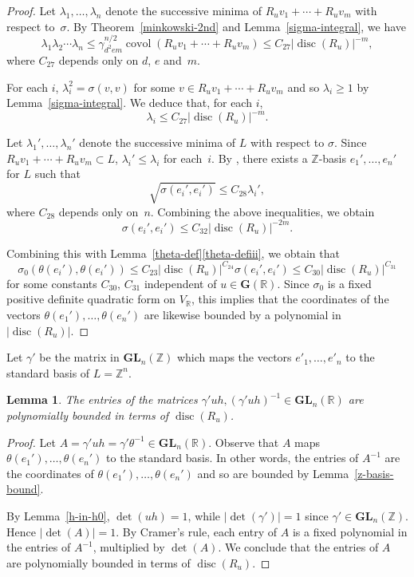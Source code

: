\documentclass[11pt]{article}
\numberwithin{equation}{section}
\newcommand{\bR}{\mathbb{R}}
\newcommand{\bZ}{\mathbb{Z}}
\newcommand{\gG}{\mathbf{G}}
\newcommand{\gGL}{\mathbf{GL}}
\DeclareMathOperator{\covol}{covol}
\DeclareMathOperator{\disc}{disc}
\newcommand{\abs}[1]{\lvert #1 \rvert}
\newtheorem{lemma}{Lemma}[section]
\begin{document}
\begin{proof}
Let $\lambda_1, \dotsc, \lambda_n$ denote the successive minima of $R_u v_1 + \dotsb + R_u v_m$ with respect to~$\sigma$.
By Theorem~\ref{minkowski-2nd} and Lemma~\ref{sigma-integral}, we have
\[
\lambda_1 \lambda_2 \dotsm \lambda_n
\leq \gamma_{d^2em}^{n/2} \covol(R_u v_1 + \dotsb + R_u v_m)
\leq C_{27} \abs{\disc(R_u)}^{-m},
\]
where $C_{27}$ depends only on $d$, $e$ and~$m$.

For each $i$, $\lambda_i^2 = \sigma(v,v)$ for some $v \in R_u v_1 + \dotsb + R_u v_m$ and so $\lambda_i \geq 1$ by Lemma~\ref{sigma-integral}.
We deduce that, for each $i$,
\[
\lambda_i \leq C_{27} \abs{\disc(R_u)}^{-m}.
\]

Let $\lambda_1', \dotsc, \lambda_n'$ denote the successive minima of $L$ with respect to $\sigma$.
Since $R_u v_1 + \dotsb + R_u v_m \subset L$, $\lambda_i' \leq \lambda_i$ for each~$i$.
By \cite[Th.\,4]{Wey40}, there exists a $\bZ$-basis $e_1', \dotsc, e_n'$ for $L$ such that
\[
\sqrt{\sigma(e_i', e_i')} \leq C_{28} \lambda_i',
\]
where $C_{28}$ depends only on~$n$.
Combining the above inequalities, we obtain
\begin{equation*}
\sigma(e_i', e_i') \leq C_{32} \abs{\disc(R_u)}^{-2m}.
\end{equation*}

Combining this with Lemma~\ref{theta-def}\eqref{theta-defiii}, we obtain that
\[
\sigma_0(\theta(e_i'), \theta(e_i'))
\leq C_{23} \abs{\disc(R_u)}^{C_{24}} \sigma(e_i', e_i')
\leq C_{30} \abs{\disc(R_u)}^{C_{31}}
\]
for some constants $C_{30}$, $C_{31}$ independent of $u \in \gG(\bR)$.
Since $\sigma_0$ is a fixed positive definite quadratic form on $V_\bR$, this implies that the coordinates of the vectors $\theta(e_1'), \dotsc, \theta(e_n')$ are likewise bounded by a polynomial in $\abs{\disc(R_u)}$.
\end{proof}

Let $\gamma'$ be the matrix in $\gGL_n(\bZ)$ which maps the vectors $e'_1, \dotsc, e'_n$ to the standard basis of $L = \bZ^n$.

\begin{lemma} \label{entries'-bound}
The entries of the matrices $\gamma' uh, (\gamma' uh)^{-1} \in \gGL_n(\bR)$ are polynomially bounded in terms of $\disc(R_u)$.
\end{lemma}

\begin{proof}
Let $A = \gamma' uh = \gamma' \theta^{-1} \in \gGL_n(\bR)$.
Observe that $A$ maps $\theta(e_1'), \dotsc, \theta(e_n')$ to the standard basis.
In other words, the entries of $A^{-1}$ are the coordinates of $\theta(e_1'), \dotsc, \theta(e_n')$ and so are bounded by Lemma~\ref{z-basis-bound}.

By Lemma~\ref{h-in-h0}, $\det(uh)=1$, while $\abs{\det(\gamma')} = 1$ since $\gamma' \in \gGL_n(\bZ)$.
Hence $\abs{\det(A)}=1$.
By Cramer's rule, each entry of $A$ is a fixed polynomial in the entries of $A^{-1}$, multiplied by $\det(A)$.
We conclude that the entries of $A$ are polynomially bounded in terms of $\disc(R_u)$.
\end{proof}
\end{document}
